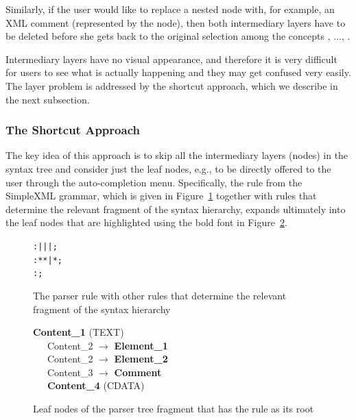 Similarly, if the user would like to replace a nested  node with, for example, an XML comment (represented by the  node), then both intermediary layers have to be deleted before she gets back to the original selection among the concepts , $\ldots$, .

Intermediary layers have no visual appearance, and therefore it is very difficult for users to see what is actually happening and they may get confused very easily.
The layer problem is addressed by the shortcut approach, which we describe in the next subsection.

\subsubsection{The Shortcut Approach}
\label{sect:SHORTCUT}

The key idea of this approach is to skip all the intermediary layers (nodes) in the syntax tree and consider just the leaf nodes, e.g., to be directly offered to the user through the auto-completion menu.
Specifically, the  rule from the SimpleXML grammar, which is given in Figure~\ref{fig:CONTENTHIERARCHY} together with rules that determine the relevant fragment of the syntax hierarchy, expands ultimately into the leaf nodes that are highlighted using the bold font in Figure~\ref{fig:CONTENTEXPAND}.

\begin{figure}[ht]
\centering
\begin{framed}
\begin{alltt}
\small
   :  |  |  |  ;
   : \antlrliteral{<}  * \antlrliteral{>} * \antlrliteral{</}  \antlrliteral{>} | \antlrliteral{<}  * \antlrliteral{/>} ;
   : \antlrliteral{<!--}  \antlrliteral{-->} ;
\end{alltt}
\end{framed}
\caption{The parser rule  with other rules that determine the relevant fragment of the syntax hierarchy}
\label{fig:CONTENTHIERARCHY}
\end{figure}

\begin{figure}[ht]
\begin{framed}
\small
\textbf{Content{\_}1} (TEXT) \\
\ \ \ Content{\_}2 $\rightarrow$ \textbf{Element{\_}1} \\
\ \ \ Content{\_}2 $\rightarrow$ \textbf{Element{\_}2} \\
\ \ \ Content{\_}3 $\rightarrow$ \textbf{Comment} \\
\ \ \ \textbf{Content{\_}4} (CDATA)
\end{framed}
\caption{Leaf nodes of the parser tree fragment that has the  rule as its root}
\label{fig:CONTENTEXPAND}
\end{figure}

